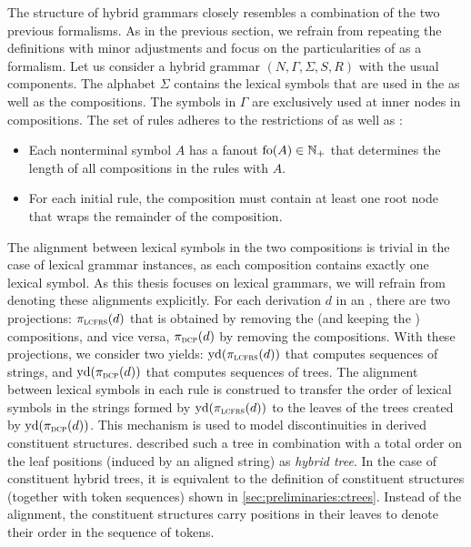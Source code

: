 \documentclass[../../document.tex]{subfiles}
\begin{document}
    The structure of hybrid grammars closely resembles a combination of the two previous formalisms.
    As in the previous section, we refrain from repeating the definitions with minor adjustments and focus on the particularities of  as a formalism.
    Let us consider a hybrid grammar \((N, \varGamma, \varSigma, S, R)\) with the usual components.
    The alphabet \(\varSigma\) contains the lexical symbols that are used in the  as well as the  compositions.
    The symbols in \(\varGamma\) are exclusively used at inner nodes in  compositions.
    The set of rules adheres to the restrictions of  as well as :
    \begin{itemize}
        \item Each nonterminal symbol \(A\) has a fanout \(\operatorname{fo}(A) \in \mathbb{N}_+\) that determines the length of all  compositions in the rules with  \(A\).
        \item For each initial rule, the  composition must contain at least one root node that wraps the remainder of the composition.
    \end{itemize}
    The alignment between lexical symbols in the two compositions is trivial in the case of lexical grammar instances, as each composition contains exactly one lexical symbol.
    As this thesis focuses on lexical grammars, we will refrain from denoting these alignments explicitly.
    For each derivation \(d\) in an , there are two projections: \(\pi_{\textsc{lcfrs}}(d)\) that is obtained by removing the  (and keeping the ) compositions, and vice versa, \(\pi_{\textsc{dcp}}(d)\) by removing the  compositions.
    With these projections, we consider two yields: \(\operatorname{yd}(\pi_{\textsc{lcfrs}}(d))\) that computes sequences of strings, and \(\operatorname{yd}(\pi_{\textsc{dcp}}(d))\) that computes sequences of trees.
    The alignment between lexical symbols in each rule is construed to transfer the order of lexical symbols in the strings formed by \(\operatorname{yd}(\pi_{\textsc{lcfrs}}(d))\) to the leaves of the trees created by \(\operatorname{yd}(\pi_{\textsc{dcp}}(d))\).
    This mechanism is used to model discontinuities in derived constituent structures.
     described such a tree in combination with a total order on the leaf positions (induced by an aligned string) as \emph{hybrid tree}.
    In the case of constituent hybrid trees, it is equivalent to the definition of constituent structures (together with token sequences) shown in \cref{sec:preliminaries:ctrees}.
    Instead of the alignment, the constituent structures carry positions in their leaves to denote their order in the sequence of tokens.
\end{document}
